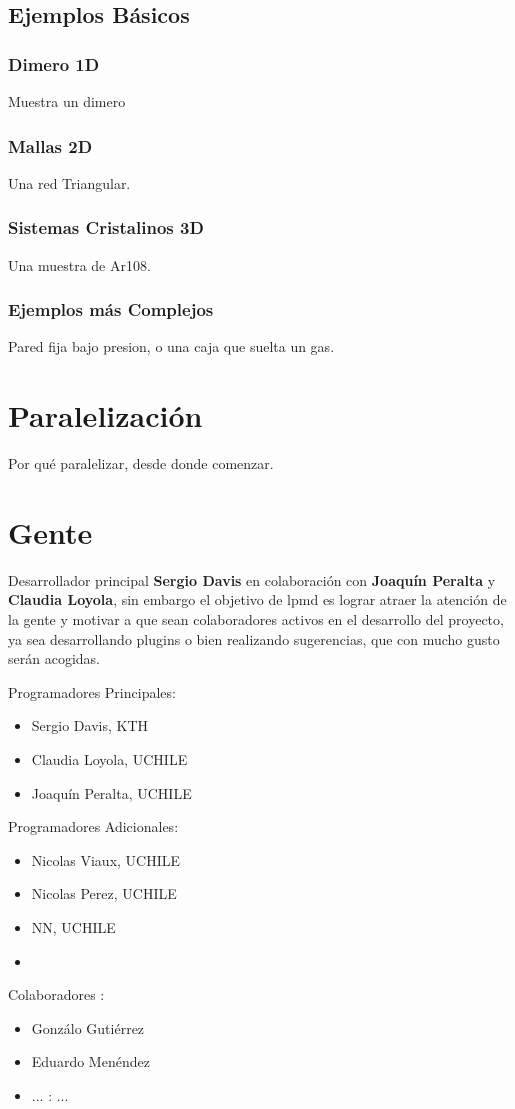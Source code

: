 \documentclass[a4paper,10pt]{scrbook}
\begin{document}
\section{Ejemplos B\'asicos}

\subsection{Dimero 1D}
Muestra un dimero 

\subsection{Mallas 2D}
Una red Triangular.

\subsection{Sistemas Cristalinos 3D}
Una muestra de Ar108.

\subsection{Ejemplos m\'as Complejos}
Pared fija bajo presion, o una caja que suelta un gas.

\chapter{Paralelizaci\'on}

Por qu\'e paralelizar, desde donde comenzar. 


\chapter{Gente}
\label{chap:auth}

Desarrollador principal \textbf{Sergio Davis} en colaboraci\'on con \textbf{Joaqu\'in Peralta} y \textbf{Claudia Loyola}, sin embargo el objetivo de lpmd es lograr atraer la atenci\'on de la gente y motivar a que sean colaboradores activos en el desarrollo del proyecto, ya sea desarrollando plugins o bien realizando sugerencias, que con mucho gusto ser\'an acogidas.

Programadores Principales:

\begin{itemize}
 \item Sergio Davis, KTH
 \item Claudia Loyola, UCHILE
 \item Joaqu\'in Peralta, UCHILE
\end{itemize}


Programadores Adicionales:

\begin{itemize}
 \item Nicolas Viaux, UCHILE
 \item Nicolas Perez, UCHILE
 \item NN, UCHILE
 \item 
\end{itemize}


Colaboradores :

\begin{itemize}
 \item Gonz\'alo Guti\'errez
 \item Eduardo Men\'endez
\end{itemize}


\begin{itemize}
 \item ... : ...
\end{itemize}
\end{document}
